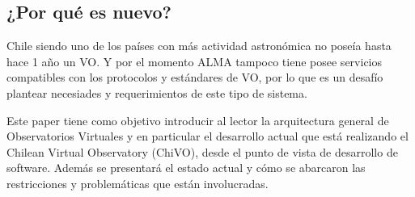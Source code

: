 \subsection{¿Por qué es nuevo?}
Chile siendo uno de los países con más actividad astronómica no poseía hasta
hace 1 año un VO. Y por el momento ALMA tampoco tiene posee servicios
compatibles con los protocolos y estándares de VO, por lo que es un desafío
plantear necesiades y requerimientos de este tipo de sistema.

Este paper tiene como objetivo introducir al lector la arquitectura general de
Observatorios Virtuales y en particular el desarrollo actual que está
realizando el Chilean Virtual Observatory (ChiVO), desde el punto de vista de
desarrollo de software. Además se presentará el estado actual y cómo se
abarcaron las restricciones y problemáticas que están involucradas.


